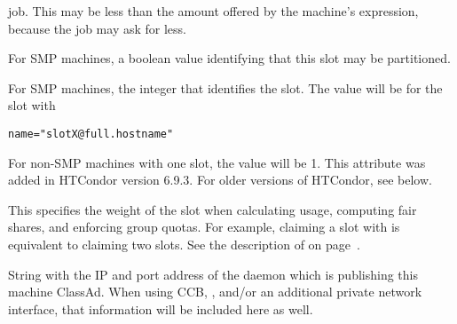 \begin{description}
job.  This may be less than the amount offered by the machine's
 expression, because the job may
ask for less.
%
\label{PartitionableSlot-machine-attribute} 
\item[\AdAttr{PartitionableSlot}:] For SMP machines,
a boolean value identifying that this slot may be partitioned.
%
\item[\AdAttr{SlotID}:] For SMP machines, the integer
that identifies the slot.
The value will be \verb@X@ for the slot with 
\begin{verbatim}
name="slotX@full.hostname"
\end{verbatim}
For non-SMP machines with one slot, the value will be 1.
\Note This attribute was added in HTCondor version 6.9.3.
For older versions of HTCondor, see  below.
%
\item[\AdAttr{SlotWeight}:]
  This specifies the weight of the slot when
  calculating usage, computing fair shares, and enforcing group
  quotas.  For example, claiming a slot with  is
  equivalent to claiming two  slots.
  See the description of  on
  page~\pageref{param:SlotWeight}.

%
\item[\AdAttr{StartdIpAddr}:] String with the IP and port address of the
 daemon which is publishing this machine ClassAd.
When using CCB, , and/or an additional private
network interface, that information will be included here as well.


\end{description}
